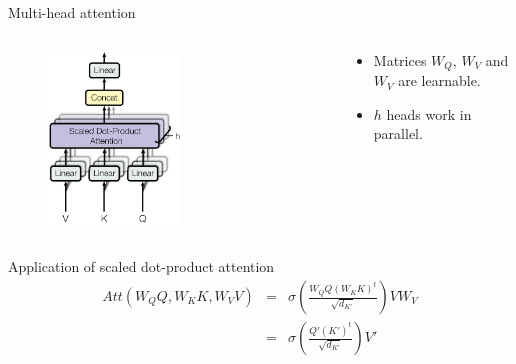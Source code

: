 \documentclass[xcolor=pdftex,dvipsnames,table,mathserif]{beamer}
\begin{document}
\begin{frame}{Multi-head attention}


\begin{columns}
  \begin{column}{.5\textwidth}
  \begin{figure}[ht]
    \centering
    \includegraphics[width=0.55\textwidth]{multi_head_attention}
  \end{figure}

  \end{column}

  \begin{column}{.5\textwidth}
  \begin{itemize}
  \item Matrices $W_Q$, $W_V$ and $W_V$ are learnable.
  \item $h$ heads work in parallel.
  \end{itemize}

  \end{column}
\end{columns}

  \begin{block}{Application of scaled dot-product attention}
    \begin{align*}
    Att(W_QQ,W_KK,W_VV) & = & \sigma\left(\frac{W_QQ(W_KK)^t}{\sqrt{d_{K'}}}\right) VW_V \\
     & = & \sigma\left(\frac{Q'(K')^t}{\sqrt{d_{K'}}}\right) V'
    \end{align*}
  \end{block}


\end{frame}
\end{document}
